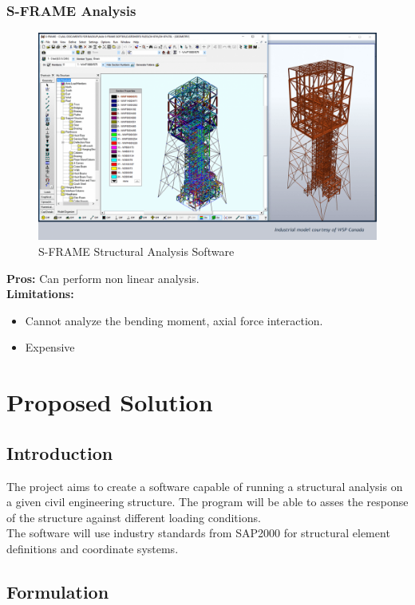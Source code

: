 \documentclass[12pt]{article}
\begin{document}
\subsubsection{S-FRAME Analysis}
\begin{figure}[H]
    \centering
    \includegraphics[scale=0.3]{images/sFrame.png}
    \caption{S-FRAME Structural Analysis Software}
    \label{fig:my_label}
\end{figure}
\textbf{Pros:} Can perform non linear analysis.\\
\textbf{Limitations:} \begin{itemize}
    \item Cannot analyze the bending moment, axial force interaction.
    \item Expensive
\end{itemize}



\section{Proposed Solution}
\subsection{Introduction}
The project aims to create a software capable of running a structural analysis on a given civil engineering structure. The program will be able to asses the response of the structure against different loading conditions.\\
The software will use industry standards from SAP2000 for structural element definitions and coordinate systems.\cite{sap-ref} 

\subsection{Formulation}
\end{document}
